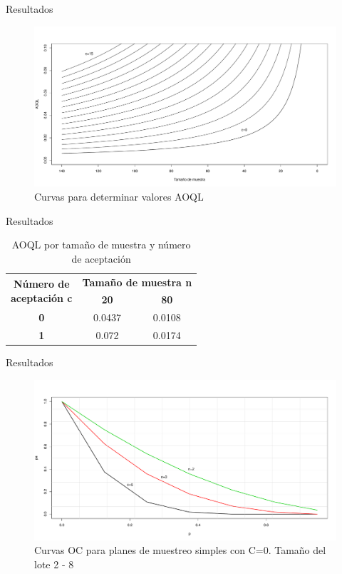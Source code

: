\documentclass[10pt]{beamer}
\begin{document}
\begin{frame}{Resultados}
\begin{figure}[h!]
  \centering
  \includegraphics[scale=0.33]{FigurasUV/Figura4.pdf}
  \caption{Curvas para determinar valores AOQL}
\end{figure}
\end{frame}

\begin{frame}{Resultados}
\begin{table}[htbp]
  \centering
    \begin{tabular}{|c|c|c|}
    \hline
    \multicolumn{1}{|c|}{\multirow{2}[4]{*}{\textbf{Número de\newline{} aceptación c}}} & \multicolumn{2}{c|}{\textbf{Tamaño de muestra n}} \\
\cline{2-3}          & \textbf{20} & \textbf{80} \\
    \hline
    \textbf{0} & 0.0437 & 0.0108 \\
    \hline
    \textbf{1} & 0.072 & 0.0174 \\
    \hline
    \end{tabular}%
    \caption{AOQL por tamaño de muestra y número de aceptación}
  \label{tab:addlabel}%
\end{table}%
\end{frame}

\begin{frame}{Resultados}
\begin{figure}[h!]
  \centering
  \includegraphics[scale=0.33]{FigurasUV/CO1.pdf}
  \caption{Curvas OC para planes de muestreo simples con C=0. Tamaño del lote 2 - 8}
\end{figure}
\end{frame}
\end{document}
